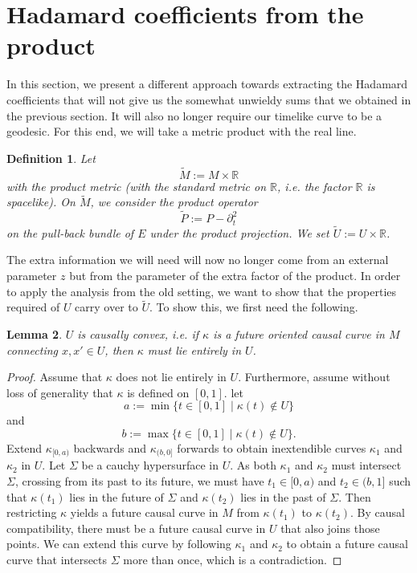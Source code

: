 \documentclass[11pt]{article}
\def\R{{\mathbb{R}}}
\newtheorem{df}{Definition}[section]
\newtheorem{lemma}[df]{Lemma}
\begin{document}
\section{Hadamard coefficients from the product}
\label{ProdDiag}
In this section, we present a different approach towards extracting the Hadamard coefficients that will not give us the somewhat unwieldy sums that we obtained in the previous section. It will also no longer require our timelike curve to be a geodesic. For this end, we will take a metric product with the real line.
\begin{df}
	\label{dfMtilde}
Let
\[\tilde M:= M\times \R\]
with the product metric (with the standard metric on $\R$, i.e. the factor $\R$ is spacelike). On $\tilde M$, we consider the product operator
\[\tilde P:= P-\partial_t^2\]
on the pull-back bundle of $E$ under the product projection. We set $\tilde U:=U\times \R$.
\end{df}
The extra information we will need will now no longer come from an external parameter $z$ but from the parameter of the extra factor of the product.
In order to apply the analysis from the old setting, we want to show that the properties required of $U$ carry over to $\tilde U$. To show this, we first need the following.
\begin{lemma}
	$U$ is causally convex, i.e. if $\kappa$ is a future oriented causal curve in $M$ connecting $x,x'\in U$, then $\kappa$ must lie entirely in $U$.
\end{lemma}
\begin{proof}
	 Assume that $\kappa$ does not lie entirely in $U$. Furthermore, assume without loss of generality that $\kappa$ is defined on $[0,1]$. let \[a:=\min\{t\in[0,1]\mid \kappa(t)\notin U\}\] and \[b:=\max\{t\in[0,1]\mid \kappa(t)\notin U\}.\]
	 Extend $\kappa_{[0,a)}$ backwards and $\kappa_{(b,0]}$ forwards to obtain inextendible curves $\kappa_1$ and $\kappa_2$ in $U$. 
	Let $\Sigma$ be a cauchy hypersurface in $U$. As both $\kappa_1$ and $\kappa_2$ must intersect $\Sigma$, crossing from its past to its future, we must have $t_1\in [0,a)$ and $t_2\in(b,1]$ such that $\kappa(t_1)$ lies in the future of $\Sigma$ and $\kappa(t_2)$ lies in the past of $\Sigma$.
	 Then restricting $\kappa$ yields a future causal curve in $M$ from $\kappa(t_1)$ to $\kappa(t_2)$. By causal compatibility, there must be a future causal curve in $U$ that also joins those points. We can extend this curve by following $\kappa_1$ and $\kappa_2$ to obtain a future causal curve that intersects $\Sigma$ more than once, which is a contradiction.
\end{proof}
\end{document}
